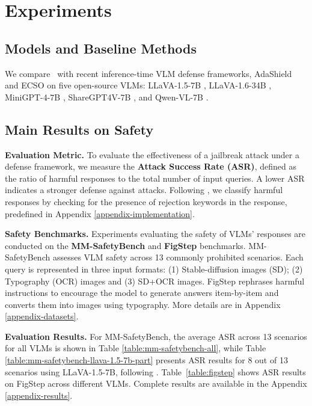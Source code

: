 \section{Experiments} \label{sec:exp}

\subsection{Models and Baseline Methods} 

We compare \OursMethod\ with recent inference-time VLM defense frameworks, AdaShield \cite{wang2024adashield} and ECSO \cite{gou2025eyes} on five open-source VLMs: LLaVA-1.5-7B \cite{liu2024visual, liu2024improved}, LLaVA-1.6-34B \cite{liu2024llava}, MiniGPT-4-7B \cite{zhu2023minigpt}, ShareGPT4V-7B \cite{chen2024sharegpt4v}, and Qwen-VL-7B \cite{bai2023qwen}.

\subsection{Main Results on Safety} 

\textbf{Evaluation Metric.} 
To evaluate the effectiveness of a jailbreak attack under a defense framework, we measure the \textbf{Attack Success Rate (ASR)}, defined as the ratio of harmful responses to the total number of input queries. A lower ASR indicates a stronger defense against attacks. Following \cite{liu2025mm, wang2024adashield}, we classify harmful responses by checking for the presence of rejection keywords in the response, predefined in 
Appendix \ref{appendix-implementation}.





\textbf{Safety Benchmarks.}
Experiments evaluating the safety of VLMs' responses are conducted on the \textbf{MM-SafetyBench} \cite{liu2025mm} and \textbf{FigStep} \cite{gong2023figstep} benchmarks. MM-SafetyBench assesses VLM safety across 13 commonly prohibited scenarios. Each query is represented in three input formats: (1) Stable-diffusion images (SD); (2) Typography (OCR) images and (3) SD+OCR images.  FigStep rephrases harmful instructions to encourage the model to generate answers item-by-item and converts them into images using typography. More details are in Appendix \ref{appendix-datasets}.

\textbf{Evaluation Results.}
For MM-SafetyBench, the average ASR across 13 scenarios for all VLMs is shown in Table \ref{table:mm-safetybench-all}, while Table \ref{table:mm-safetybench-llava-1.5-7b-part} presents ASR results for 8 out of 13 scenarios using LLaVA-1.5-7B, following \cite{gou2025eyes}. Table~\ref{table:figstep} shows ASR results on FigStep across different VLMs. Complete results are available in the Appendix \ref{appendix-results}.

